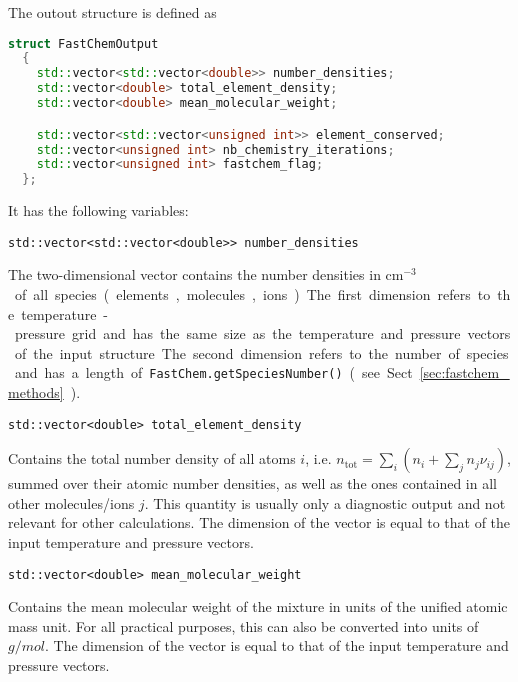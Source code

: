 \documentclass[numbers=noenddot]{aux/fcmanual}
\begin{document}
The outout structure is defined as
\begin{lstlisting}[language=C++]
  struct FastChemOutput
  {
    std::vector<std::vector<double>> number_densities;
    std::vector<double> total_element_density;
    std::vector<double> mean_molecular_weight;

    std::vector<std::vector<unsigned int>> element_conserved;
    std::vector<unsigned int> nb_chemistry_iterations;
    std::vector<unsigned int> fastchem_flag;
  };
\end{lstlisting}

It has the following variables:

\lstinline!std::vector<std::vector<double>> number_densities!
  \begin{addmargin}[25pt]{0pt}
    The two-dimensional vector contains the number densities in \unit{cm$^{-3}$} of all species (elements, molecules, ions). The first dimension refers to the temperature-pressure grid and has the same size as the temperature and pressure vectors of the input structure. The second dimension refers to the number of species and has a length of \lstinline!FastChem.getSpeciesNumber()! (see Sect. \ref{sec:fastchem_methods}).
  \end{addmargin}
  
\bigbreak

\lstinline!std::vector<double> total_element_density!
\begin{addmargin}[25pt]{0pt}
  Contains the total number density of all atoms $i$, i.e. $n_\mathrm{tot} = \sum_i \left( n_i + \sum_j n_j \nu_{ij} \right)$, summed over their atomic number densities, as well as the ones contained in all other molecules/ions $j$. This quantity is usually only a diagnostic output and not relevant for other calculations. The dimension of the vector is equal to that of the input temperature and pressure vectors.
\end{addmargin}

\bigbreak

\lstinline!std::vector<double> mean_molecular_weight!
\begin{addmargin}[25pt]{0pt}
  Contains the mean molecular weight of the mixture in units of the unified atomic mass unit. For all practical purposes, this can also be converted into units of $\unit{g/mol}$. The dimension of the vector is equal to that of the input temperature and pressure vectors.
\end{addmargin}

\bigbreak
\end{document}
